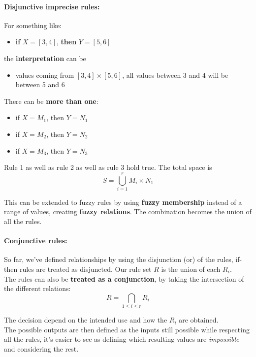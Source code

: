 \paragraph{Disjunctive imprecise rules:} For something like:
\begin{itemize}[label*=]
	\item \textbf{if} $X = [3,4]$, \textbf{then} $Y = [5,6]$
\end{itemize}
the \textbf{interpretation} can be
\begin{itemize}[label*=]
	\item values coming from $[3,4] \times [5,6]$, all values between 3 and 4 will be between 5 and 6
\end{itemize}

There can be \textbf{more than one}: 
\begin{itemize}
	\item if $X = M_1$, then $Y=N_1$
	\item if $X = M_2$, then $Y=N_2$
	\item if $X = M_3$, then $Y=N_3$
\end{itemize}
Rule 1 as well as rule 2 as well as rule 3 hold true. The total space is
$$ S = \bigcup_{i=1}^r M_i \times N_1 $$

This can be extended to fuzzy rules by using \textbf{fuzzy membership} instead of a range of values, creating \textbf{fuzzy relations}. The combination becomes the union of all the rules.\\

\newpage

\paragraph{Conjunctive rules:} So far, we've defined relationships by using the disjunction (or) of the rules, if-then rules are treated as disjuncted. Our rule set $R$ is the union of each $R_i$.\\

The rules can also be \textbf{treated as a conjunction}, by taking the intersection of the different relations:
$$ R = \bigcap_{1 \leq i \leq r} R_i $$

The decision depend on the intended use and how the $R_i$ are obtained.\\

The possible outputs are then defined as the inputs still possible while respecting all the rules, it's easier to see as defining which resulting values are \textit{impossible} and considering the rest.\\





